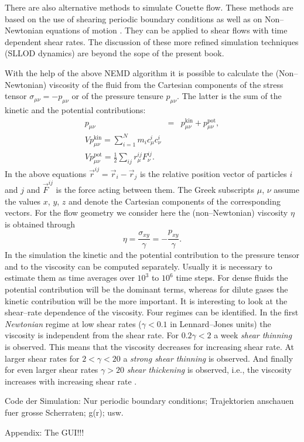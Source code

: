 There are also alternative methods to simulate Couette flow. These methods are
based on the use of shearing periodic boundary conditions as well as on 
Non--Newtonian equations of motion .
They can be applied to shear flows with
time dependent shear rates. The discussion of these more refined simulation
techniques (SLLOD dynamics) 
\cite{Allen} are beyond the sope of the present book. 

With the help of the above NEMD algorithm it is possible to calculate the
(Non--Newtonian) viscosity  of 
the fluid from the Cartesian components of the
stress tensor  $\sigma_{\mu \nu} = - p_{\mu \nu}$ or
of the pressure tensure  $p_{\mu \nu}$. The latter is
the sum of the kinetic and the potential contributions:
\begin{eqnarray*}
  p_{\mu \nu} & = & p_{\mu \nu}^{\mathrm{kin}} +p_{\mu \nu}^{\mathrm{pot}}, \\
  V  p_{\mu \nu}^{\mathrm{kin}} = \sum_{i=1}^N m_i c^i_{\mu} c^i_{\nu} \\
  V p_{\mu \nu}^{\mathrm{pot}} = \frac{1}{2} \sum_{ij} 
                    r_{\mu}^{ij} F_{\nu}^{ij}. 
\end{eqnarray*}
In the above equations $\vec{r}^{ij} = \vec{r}_i - \vec{r}_j$ is the relative
position vector of particles $i$ and $j$ and $\vec{F}^{ij}$ is the force
acting between them. The Greek subscripts $\mu$, $\nu$ assume the values
$x$, $y$, $z$ and denote the Cartesian components of the corresponding
vectors. For the flow geometry we consider here the (non--Newtonian) viscosity
$\eta$ is obtained through
\begin{displaymath}
  \eta = \frac{\sigma_{xy}}{\gamma} = -\frac{p_{xy}}{\gamma}.
\end{displaymath}
In the simulation the kinetic and the potential contribution to the pressure
tensor and to the viscosity can be computed separately. Usually it is
necessary to estimate them as time averages over $10^3$ to $10^6$ time steps.
For dense fluids the potential contribution will be the dominant terms,
whereas for dilute gases the kinetic contribution will be the more important. 
It is interesting to look at the shear--rate dependence of the viscosity. Four
regimes can be identified. In the first {\textit{Newtonian}} regime
at low shear rates ($\gamma < 0.1$ in Lennard--Jones units) the 
viscosity is independent from the shear rate. For $0.2 \gamma <2$ a week
\textit{shear thinning}  is observed. 
This means that the viscosity decreases
for increasing shear rate. At larger shear rates for $2 < \gamma < 20$ a
\textit{strong shear thinning} is observed. And finally for even larger shear
rates $\gamma >20$ \textit{shear thickening}  
is observed, i.e., the viscosity increases with increasing shear rate
\cite{Hess}. 


Code der Simulation: Nur periodic boundary conditions; Trajektorien anschauen
fuer grosse Scherraten; g(r); usw.

Appendix: The GUI!!!














